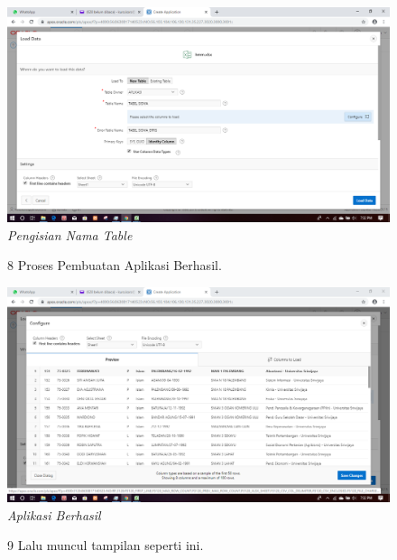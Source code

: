 \begin{enumerate}
\begin{figure}
    \begin{center}
\includegraphics[scale=0.2]{figures/7.png}
    \caption{\textit{Pengisian Nama Table}}
        \end{center}
\label{gambar}
\end{figure}

\begin{figure}
\item[8] Proses Pembuatan Aplikasi Berhasil.

    \begin{center}
\includegraphics[scale=0.2]{figures/8.png}
    \caption{\textit{Aplikasi Berhasil}}
        \end{center}
\label{gambar}
\end{figure}

\begin{figure}
\item[9] Lalu muncul tampilan seperti ini.


\end{figure}
\end{enumerate}
